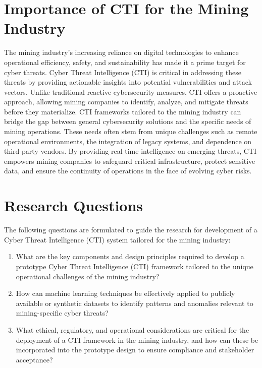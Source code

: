 \documentclass[a4paper,twoside,12pt]{report}
\begin{document}
\section{Importance of CTI for the Mining Industry}
The mining industry's increasing reliance on digital technologies to enhance operational efficiency, safety, and sustainability has made it a prime target for cyber threats. Cyber Threat Intelligence (CTI) is critical in addressing these threats by providing actionable insights into potential vulnerabilities and attack vectors. Unlike traditional reactive cybersecurity measures, CTI offers a proactive approach, allowing mining companies to identify, analyze, and mitigate threats before they materialize.
CTI frameworks tailored to the mining industry can bridge the gap between general cybersecurity solutions and the specific needs of mining operations. These needs often stem from unique challenges such as remote operational environments, the integration of legacy systems, and dependence on third-party vendors. By providing real-time intelligence on emerging threats, CTI empowers mining companies to safeguard critical infrastructure, protect sensitive data, and ensure the continuity of operations in the face of evolving cyber risks.


\section{Research Questions}

The following questions are formulated to guide the research for development of a Cyber Threat Intelligence (CTI) system tailored for the mining industry:

\begin{enumerate}
    \item {What are the key components and design principles required to develop a prototype Cyber Threat Intelligence (CTI) framework tailored to the unique operational challenges of the mining industry?}
    \item {How can machine learning techniques be effectively applied to publicly available or synthetic datasets to identify patterns and anomalies relevant to mining-specific cyber threats?}
    \item {What ethical, regulatory, and operational considerations are critical for the deployment of a CTI framework in the mining industry, and how can these be incorporated into the prototype design to ensure compliance and stakeholder acceptance?}
\end{enumerate}
\end{document}
